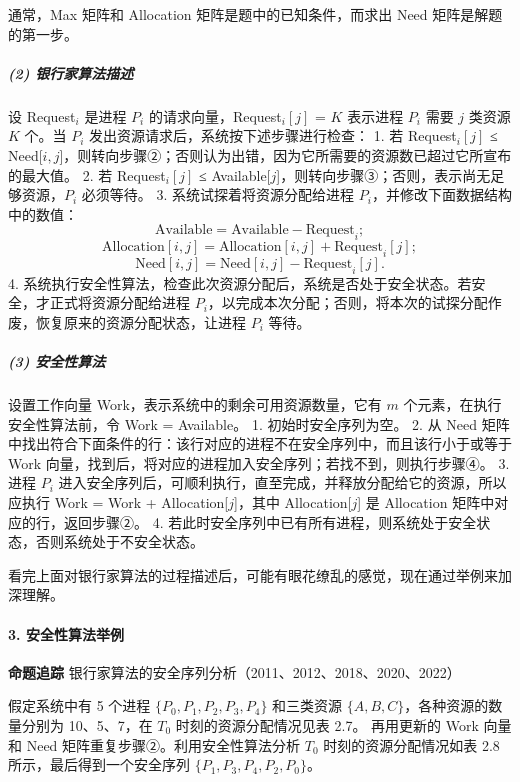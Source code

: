 \documentclass{ctexbook}
\begin{document}
	通常，Max 矩阵和 Allocation 矩阵是题中的已知条件，而求出 Need 矩阵是解题的第一步。
	
	\subparagraph{(2) 银行家算法描述}
	
	设 Request$_i$ 是进程 $P_i$ 的请求向量，Request$_i[j]$ = $K$ 表示进程 $P_i$ 需要 $j$ 类资源 $K$ 个。当 $P_i$ 发出资源请求后，系统按下述步骤进行检查：
	1. 若 Request$_i[j]$ ≤ Need[$i, j$]，则转向步骤②；否则认为出错，因为它所需要的资源数已超过它所宣布的最大值。
	2. 若 Request$_i[j]$ ≤ Available[$j$]，则转向步骤③；否则，表示尚无足够资源，$P_i$ 必须等待。
	3. 系统试探着将资源分配给进程 $P_i$，并修改下面数据结构中的数值：
	\[
	\text{Available} = \text{Available} - \text{Request}_i;
	\]
	\[
	\text{Allocation}[i, j] = \text{Allocation}[i, j] + \text{Request}_i[j];
	\]
	\[
	\text{Need}[i, j] = \text{Need}[i, j] - \text{Request}_i[j].
	\]
	4. 系统执行安全性算法，检查此次资源分配后，系统是否处于安全状态。若安全，才正式将资源分配给进程 $P_i$，以完成本次分配；否则，将本次的试探分配作废，恢复原来的资源分配状态，让进程 $P_i$ 等待。
	
	\subparagraph{(3) 安全性算法}
	
	设置工作向量 Work，表示系统中的剩余可用资源数量，它有 $m$ 个元素，在执行安全性算法前，令 Work = Available。
	1. 初始时安全序列为空。
	2. 从 Need 矩阵中找出符合下面条件的行：该行对应的进程不在安全序列中，而且该行小于或等于 Work 向量，找到后，将对应的进程加入安全序列；若找不到，则执行步骤④。
	3. 进程 $P_i$ 进入安全序列后，可顺利执行，直至完成，并释放分配给它的资源，所以应执行 Work = Work + Allocation[$j$]，其中 Allocation[$j$] 是 Allocation 矩阵中对应的行，返回步骤②。
	4. 若此时安全序列中已有所有进程，则系统处于安全状态，否则系统处于不安全状态。
	
	看完上面对银行家算法的过程描述后，可能有眼花缭乱的感觉，现在通过举例来加深理解。
	
	\paragraph{3. 安全性算法举例}
	
	\textbf{命题追踪} 银行家算法的安全序列分析（2011、2012、2018、2020、2022）
	
	假定系统中有 5 个进程 $\{P_0, P_1, P_2, P_3, P_4\}$ 和三类资源 $\{A, B, C\}$，各种资源的数量分别为 10、5、7，在 $T_0$ 时刻的资源分配情况见表 2.7。
	再用更新的 Work 向量和 Need 矩阵重复步骤②。利用安全性算法分析 $T_0$ 时刻的资源分配情况如表 2.8 所示，最后得到一个安全序列 $\{P_1, P_3, P_4, P_2, P_0\}$。
	
\end{document}
